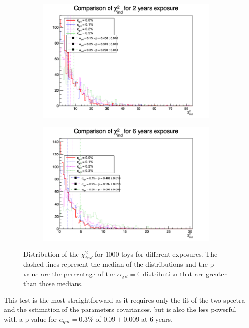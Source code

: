 \documentclass[../main.tex]{subfiles}
\begin{document}
\begin{figure}[th]
  \begin{subfigure}[t]{0.48\linewidth}
    \includegraphics[width=\linewidth]{images/joint_fit/stat_tests/chi2_ind_2y.png}
  \end{subfigure}
  \begin{subfigure}[t]{0.48\linewidth}
    \includegraphics[width=\linewidth]{images/joint_fit/stat_tests/chi2_ind_6y.png}
  \end{subfigure}
  \caption{Distribution of the $\chi^2_{ind}$ for 1000 toys for different exposures. The dashed lines represent the median of the distributions and the p-value are the percentage of the $\alpha_{qnl} = 0$ distribution that are greater than those medians.}
  \label{fig:joint_fit:chi2_ind}
\end{figure}

This test is the most straightforward as it requires only the fit of the two spectra and the estimation of the parameters covariances, but is also the less powerful with a p value for $\alpha_{qnl} = 0.3\%$ of $0.09 \pm 0.009$ at 6 years.
\end{document}

